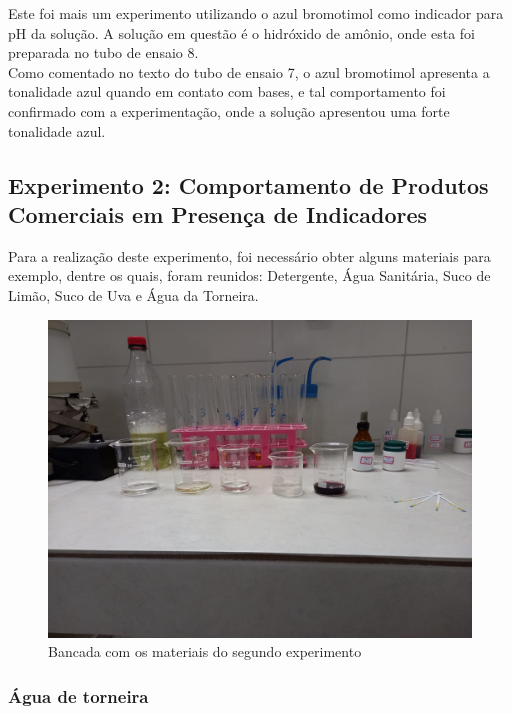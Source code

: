     	\indent Este foi mais um experimento utilizando o azul bromotimol como indicador para pH da solução. A solução em questão é o hidróxido de amônio, onde esta foi preparada no tubo de ensaio 8. \\
    	
    	\indent Como comentado no texto do tubo de ensaio 7, o azul bromotimol apresenta a tonalidade azul quando em contato com bases, e tal comportamento foi confirmado com a experimentação, onde a solução apresentou uma forte tonalidade azul.

        \newpage
        
        \subsection{Experimento 2: Comportamento de Produtos Comerciais em Presença de Indicadores}\label{subsubsec:mat_metodos_exp2}
        \indent Para a realização deste experimento, foi necessário obter alguns materiais para exemplo, dentre os quais, foram reunidos: Detergente, Água Sanitária, Suco de Limão, Suco de Uva e Água da Torneira.
        
        \begin{figure}[h]
        	\centering
        	\includegraphics[scale=0.25]{pictures/bancada.jpeg}
        	\caption{Bancada com os materiais do segundo experimento}
        	\label{fig: Bancada do segundo experimento}
        \end{figure}
    
        \subsubsection{Água de torneira}\label{exp2:aguatorneira}

